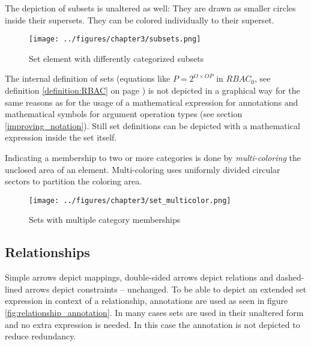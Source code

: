 \documentclass[twoside, openright, 12pt]{book}
\begin{document}
\noindent
The depiction of subsets is unaltered as well: They are drawn as smaller circles inside their supersets.
They can be colored individually to their superset.\\

\begin{figure}[htb]
	\centering
	\texttt{[image: ../figures/chapter3/subsets.png]}
	\caption{Set element with differently categorized subsets}
	\label{fig:subsets}
\end{figure}

\noindent
The internal definition of sets (equations like $P = 2^{O \times OP}$ in $RBAC_0$, see definition \ref{definition:RBAC} on page \pageref{definition:RBAC}) is not depicted in a graphical way for the same reasons as for the usage of a mathematical expression for annotations and mathematical symbols for argument operation types (see section \ref{improving_notation}).
Still set definitions can be depicted with a mathematical expression inside the set itself.%
%

Indicating a membership to two or more categories is done by \textit{multi-coloring} the unclosed area of an element.
Multi-coloring uses uniformly divided circular sectors to partition the coloring area.

\begin{figure}[htb]
	\centering
	\texttt{[image: ../figures/chapter3/set\_multicolor.png]}
	\caption{Sets with multiple category memberships}
	\label{fig:set_multicolor}
\end{figure}


\subsection{Relationships}
Simple arrows depict mappings, double-sided arrows depict relations and dashed-lined arrows depict constraints -- unchanged.
To be able to depict an extended set expression in context of a relationship, annotations are used as seen in figure \ref{fig:relationship_annotation}.
In many cases sets are used in their unaltered form and no extra expression is needed.
In this case the annotation is not depicted to reduce redundancy.
\end{document}
